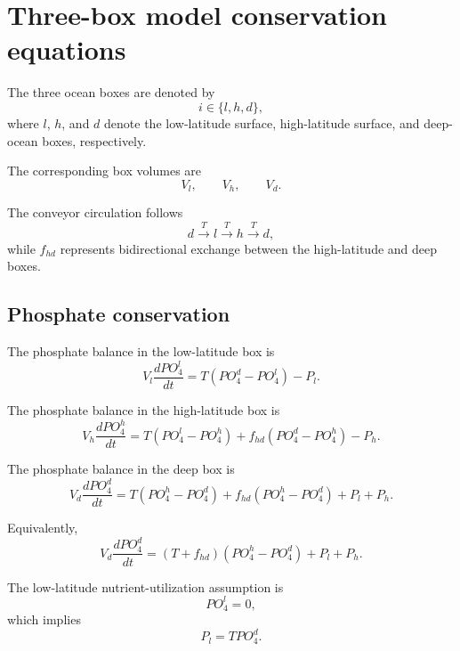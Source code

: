 \documentclass[11pt]{article}
\begin{document}
\section{Three-box model conservation equations}

The three ocean boxes are denoted by
\[
i\in\{l,h,d\},
\]
where \(l\), \(h\), and \(d\) denote the low-latitude surface,
high-latitude surface, and deep-ocean boxes, respectively.

The corresponding box volumes are
\[
V_l,\qquad V_h,\qquad V_d.
\]

The conveyor circulation follows
\[
d \xrightarrow{T} l \xrightarrow{T} h \xrightarrow{T} d,
\]
while \(f_{hd}\) represents bidirectional exchange between
the high-latitude and deep boxes.

\subsection{Phosphate conservation}

The phosphate balance in the low-latitude box is
\begin{equation}
V_l\frac{dPO_4^l}{dt}
=
T\left(PO_4^d-PO_4^l\right)
-
P_l.
\label{eq:po4_l}
\end{equation}

The phosphate balance in the high-latitude box is
\begin{equation}
V_h\frac{dPO_4^h}{dt}
=
T\left(PO_4^l-PO_4^h\right)
+
f_{hd}\left(PO_4^d-PO_4^h\right)
-
P_h.
\label{eq:po4_h}
\end{equation}

The phosphate balance in the deep box is
\begin{equation}
V_d\frac{dPO_4^d}{dt}
=
T\left(PO_4^h-PO_4^d\right)
+
f_{hd}\left(PO_4^h-PO_4^d\right)
+
P_l+P_h.
\label{eq:po4_d}
\end{equation}

Equivalently,
\begin{equation}
V_d\frac{dPO_4^d}{dt}
=
\left(T+f_{hd}\right)
\left(PO_4^h-PO_4^d\right)
+
P_l+P_h.
\end{equation}

The low-latitude nutrient-utilization assumption is
\begin{equation}
PO_4^l=0,
\label{eq:po4_l_zero}
\end{equation}
which implies
\begin{equation}
P_l=TPO_4^d.
\label{eq:Pl_constraint}
\end{equation}
\end{document}
